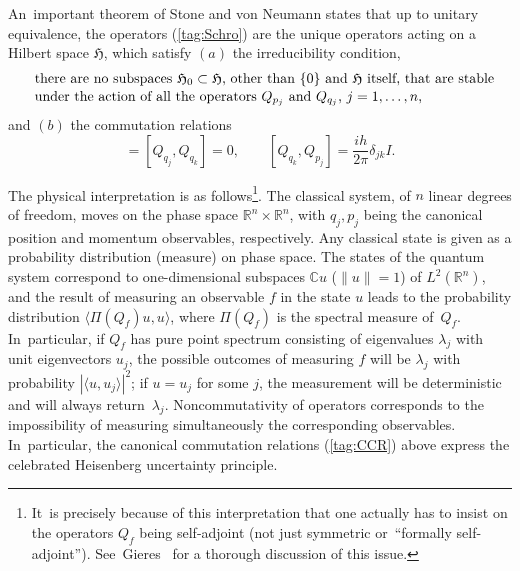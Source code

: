 \documentclass[11pt]{amsart}
\numberwithin{equation}{section}
\theoremstyle{remark}
\newcommand\spr[2]{\langle #1,#2\rangle}
\newcommand\HH{\mathfrak H}
\newcommand\RR{\mathbb R}
\newcommand{\CC}{\C}
\newcommand{\C}{\mathbb C}
\begin{document}
An~important theorem of Stone and von Neumann  \cite{bib:vNeu}
states that up to unitary
equivalence, the operators (\ref{tag:Schro}) are the unique operators acting on
a Hilbert space $\HH$, which satisfy $(a)$ the irreducibility condition,
\begin{equation}  \begin{aligned}
& \text{there are no subspaces $\HH_0\subset\HH$, other than $\{0\}$ and $\HH$
itself, that are stable} \\
\noalign{\vskip-2pt}
& \text{under the action  of all the operators $Q_{p_j}$ and $Q_{q_j}$,
$j=1,\dots,n$,} \end{aligned}  \label{tag:IRE}  \end{equation}
and $(b)$ the commutation relations
\begin{equation}  [Q_{p_j},Q_{p_k}] = [Q_{q_j},Q_{q_k}] =0, \qquad
[Q_{q_k}, Q_{p_j}] = \frac{ih}{2\pi} \delta_{jk} I . \label{tag:CCR}
\end{equation}


The physical interpretation is as follows\footnote{It~is
precisely because of this interpretation that one actually has to
insist on the operators $Q_f$ being self-adjoint (not just
symmetric or~``formally self-adjoint'').
See~Gieres~\cite{bib:Gieres} for a thorough discussion of this
issue.}. The classical system, of $n$ linear degrees of freedom,
moves on the phase space $\RR^n \times \RR^n$, with $q_j, p_j$ being
the canonical position and momentum observables, respectively. Any classical
state is given as a probability distribution (measure) on phase space.
The states of the quantum system correspond to
one-dimensional subspaces $\CC u$ ($\|u\|=1$) of $L^2(\RR^n)$, and
the result of measuring an observable $f$ in the state $u$ leads to the
probability distribution $\spr{\Pi(Q_f) u}u$, where
$\Pi(Q_f)$ is the spectral measure of~$Q_f$. In~particular, if
$Q_f$ has pure point spectrum consisting of eigenvalues
$\lambda_j$ with unit eigenvectors $u_j$, the possible outcomes of
measuring $f$ will be $\lambda_j$ with probability $|\spr
u{u_j}|^2$; if $u=u_j$ for some $j$, the measurement will be
deterministic and will always return~$\lambda_j$. Noncommutativity
of operators corresponds to the impossibility of measuring
simultaneously the corresponding observables. In~particular, the
canonical commutation relations (\ref{tag:CCR}) above express the
celebrated Heisenberg uncertainty principle.
\end{document}
